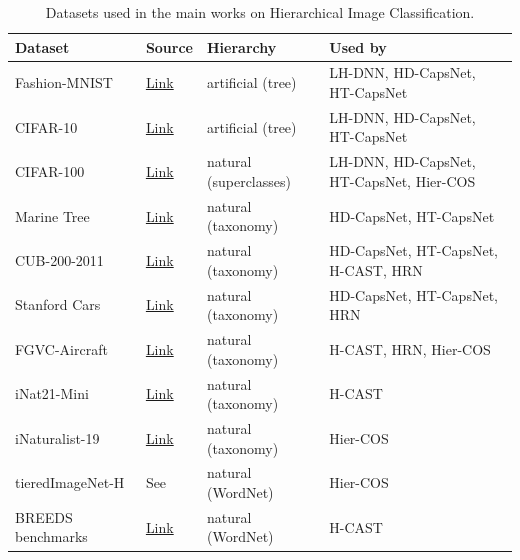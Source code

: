 \begin{table}[!h]
\centering
\caption{Datasets used in the main works on Hierarchical Image Classification.}
\label{tab:datasets_hic}

\begin{tabularx}{\textwidth}{l l l X}
\toprule
\textbf{Dataset} & \textbf{Source} & \textbf{Hierarchy} & \textbf{Used by} \\
\midrule

Fashion-MNIST & \href{https://github.com/zalandoresearch/fashion-mnist}{Link} & artificial (tree) & LH-DNN, HD-CapsNet, HT-CapsNet \\
\midrule

CIFAR-10 & \href{https://www.cs.toronto.edu/~kriz/cifar.html}{Link} & artificial (tree) & LH-DNN, HD-CapsNet, HT-CapsNet \\
\midrule

CIFAR-100 & \href{https://www.cs.toronto.edu/~kriz/cifar.html}{Link} & natural (superclasses) & LH-DNN, HD-CapsNet, HT-CapsNet, Hier-COS \\
\midrule

Marine Tree & \href{https://github.com/visipedia/marine-tree}{Link} & natural (taxonomy) & HD-CapsNet, HT-CapsNet \\
\midrule

CUB-200-2011 & \href{https://www.vision.caltech.edu/datasets/cub_200_2011/}{Link} & natural (taxonomy) & HD-CapsNet, HT-CapsNet, H-CAST, HRN \\
\midrule

Stanford Cars & \href{https://ai.stanford.edu/~jkrause/cars/car_dataset.html}{Link} & natural (taxonomy) & HD-CapsNet, HT-CapsNet, HRN \\
\midrule

FGVC-Aircraft & \href{https://www.robots.ox.ac.uk/~vgg/data/fgvc-aircraft/}{Link} & natural (taxonomy) & H-CAST, HRN, Hier-COS \\
\midrule

iNat21-Mini & \href{https://github.com/visipedia/inat_comp/tree/master/2021}{Link} & natural (taxonomy) & H-CAST \\
\midrule

iNaturalist-19 & \href{https://github.com/visipedia/inat_comp/tree/master/2019}{Link} & natural (taxonomy) & Hier-COS \\
\midrule

tieredImageNet-H & See \cite{zeng2023learning} & natural (WordNet) & Hier-COS \\
\midrule

BREEDS benchmarks & \href{https://github.com/microsoft/robustness/tree/master/robustness/tools/breeds_helpers}{Link} & natural (WordNet) & H-CAST \\

\bottomrule
\end{tabularx}

\end{table}


